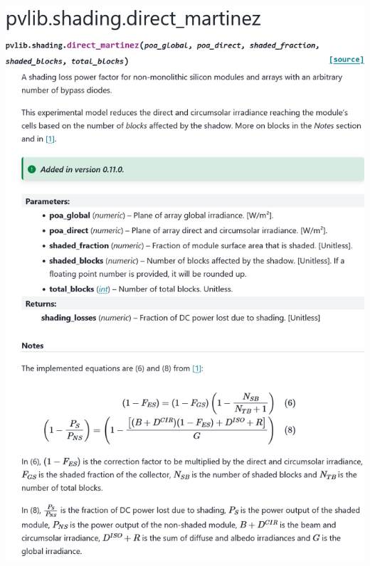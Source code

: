 \begin{myparindent}{0pt}
\includegraphics[width=\linewidth,height=0.9\textheight,keepaspectratio]{images/docs_funcs_cut/direct_martinez_0.png}


\end{myparindent}
